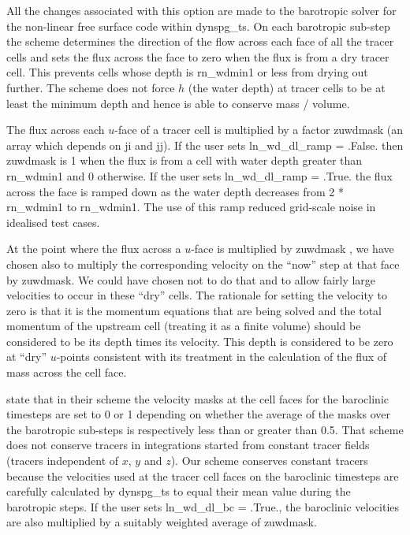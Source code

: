 \documentclass[../main/NEMO_manual]{subfiles}
\begin{document}
All the changes associated with this option are made to the barotropic solver for the non-linear
free surface code within dynspg\_ts.
On each barotropic sub-step the scheme determines the direction of the flow across each face of all the tracer cells
and sets the flux across the face to zero when the flux is from a dry tracer cell. This prevents cells
whose depth is rn\_wdmin1 or less from drying out further. The scheme does not force $h$ (the water depth) at tracer cells
to be at least the minimum depth and hence is able to conserve mass / volume.

The flux across each $u$-face of a tracer cell is multiplied by a factor zuwdmask (an array which depends on ji and jj).
If the user sets ln\_wd\_dl\_ramp = .False. then zuwdmask is 1 when the
flux is from a cell with water depth greater than rn\_wdmin1 and 0 otherwise. If the user sets
ln\_wd\_dl\_ramp = .True. the flux across the face is ramped down as the water depth decreases
from 2 * rn\_wdmin1 to rn\_wdmin1. The use of this ramp reduced grid-scale noise in idealised test cases.

At the point where the flux across a $u$-face is multiplied by zuwdmask , we have chosen
also to multiply the corresponding velocity on the ``now'' step at that face by zuwdmask. We could have
chosen not to do that and to allow fairly large velocities to occur in these ``dry'' cells.
The rationale for setting the velocity to zero is that it is the momentum equations that are being solved
and the total momentum of the upstream cell (treating it as a finite volume) should be considered
to be its depth times its velocity. This depth is considered to be zero at ``dry'' $u$-points consistent with its
treatment in the calculation of the flux of mass across the cell face.


\cite{WarnerEtal13} state that in their scheme the velocity masks at the cell faces for the baroclinic
timesteps are set to 0 or 1 depending on whether the average of the masks over the barotropic sub-steps is respectively less than
or greater than 0.5. That scheme does not conserve tracers in integrations started from constant tracer
fields (tracers independent of $x$, $y$ and $z$). Our scheme conserves constant tracers because
the velocities used at the tracer cell faces on the baroclinic timesteps are carefully calculated by dynspg\_ts
to equal their mean value during the barotropic steps. If the user sets ln\_wd\_dl\_bc = .True., the
baroclinic velocities are also multiplied by a suitably weighted average of zuwdmask.  
\end{document}
